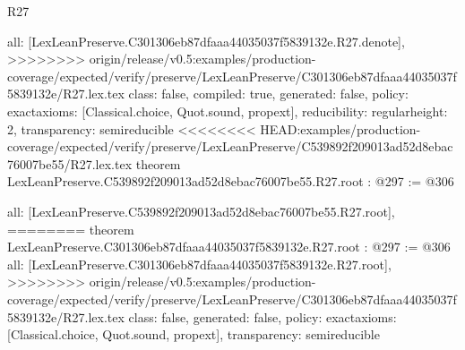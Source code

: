 \begin{lexlean}{R27}
\begin{coremodule}
{{{{{  all: [LexLeanPreserve.C301306eb87dfaaa44035037f5839132e.R27.denote],
>>>>>>>> origin/release/v0.5:examples/production-coverage/expected/verify/preserve/LexLeanPreserve/C301306eb87dfaaa44035037f5839132e/R27.lex.tex
  class: false,
  compiled: true,
  generated: false,
  policy: exact{axioms: [Classical.choice, Quot.sound, propext]},
  reducibility: regular{height: 2},
  transparency: semireducible
}
<<<<<<<< HEAD:examples/production-coverage/expected/verify/preserve/LexLeanPreserve/C539892f209013ad52d8ebac76007be55/R27.lex.tex
theorem LexLeanPreserve.C539892f209013ad52d8ebac76007be55.R27.root : @297 := @306 {
  all: [LexLeanPreserve.C539892f209013ad52d8ebac76007be55.R27.root],
========
theorem LexLeanPreserve.C301306eb87dfaaa44035037f5839132e.R27.root : @297 := @306 {
  all: [LexLeanPreserve.C301306eb87dfaaa44035037f5839132e.R27.root],
>>>>>>>> origin/release/v0.5:examples/production-coverage/expected/verify/preserve/LexLeanPreserve/C301306eb87dfaaa44035037f5839132e/R27.lex.tex
  class: false,
  generated: false,
  policy: exact{axioms: [Classical.choice, Quot.sound, propext]},
  transparency: semireducible
}

}}}}}
\end{coremodule}
\end{lexlean}
